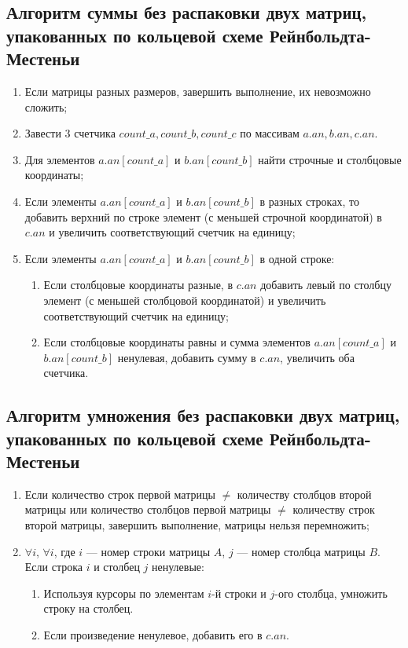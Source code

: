 \documentclass[12pt, a4paper]{article}
\begin{document}
\subsection{Алгоритм суммы без распаковки двух 
матриц, упакованных по кольцевой схеме Рейнбольдта-Местеньи}
\begin{enumerate}
	\item Если матрицы разных размеров, завершить 
	выполнение, их невозможно сложить;
	\item Завести 3 счетчика $count\_a, count\_b, 
	count\_c$ по массивам $a.an, b.an, c.an$.
	\item Для элементов $a.an[count\_a]$ и 
	$b.an[count\_b]$ найти строчные и столбцовые 
	координаты;
	\item Если элементы $a.an[count\_a]$ и 
	$b.an[count\_b]$ в разных строках, то добавить 
	верхний по строке элемент (с меньшей строчной 
	координатой) в $c.an$ и увеличить соответствующий 
	счетчик на единицу;
	\item Если элементы $a.an[count\_a]$ и 
	$b.an[count\_b]$ в одной строке:
	\begin{enumerate}
		\item Если столбцовые координаты разные, в 
		$c.an$ добавить левый по столбцу элемент (с 
		меньшей столбцовой координатой) и увеличить 
		соответствующий счетчик на единицу;
		\item Если столбцовые координаты равны и сумма элементов $a.an[count\_a]$ и 
			$b.an[count\_b]$ ненулевая, добавить сумму в $c.an$, увеличить оба счетчика.
	\end{enumerate}
\end{enumerate}
\subsection{Алгоритм умножения без распаковки двух 
матриц, упакованных по кольцевой схеме Рейнбольдта-Местеньи}
\begin{enumerate}
	\item Если количество строк первой матрицы $\neq$
	количеству столбцов второй матрицы или количество
	столбцов первой матрицы $\neq$ количеству строк 
	второй матрицы, завершить выполнение, матрицы нельзя 
	перемножить;
	\item $\forall i$, $\forall i$, где $i$ --- номер строки матрицы $A$, $j$ --- номер столбца матрицы $B$. Если строка $i$ и столбец $j$ ненулевые:
	\begin{enumerate}
		\item Используя курсоры по элементам $i$-й 
		строки и $j$-ого столбца, умножить строку на 
		столбец.
		\item Если произведение ненулевое, добавить его 
		в $c.an$.
	\end{enumerate}
\end{enumerate}
\end{document}
